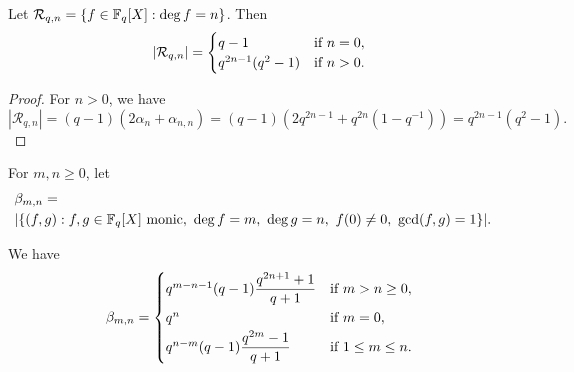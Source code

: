 \documentclass{amsart}
\numberwithin{equation}{section}
\theoremstyle{definition}
\newcommand{\f}{\Bbb F}
\begin{document}
\begin{Alem}\label{LA2}
Let $\mathcal R_{q,n}=\{f\in\f_q[X]:\deg f=n\}$. Then
\[
|\mathcal R_{q,n}|=\begin{cases}
q-1&\text{if}\ n=0,\cr
q^{2n-1}(q^2-1)&\text{if}\ n>0.
\end{cases}
\]
\end{Alem}

\begin{proof}
For $n>0$, we have
\[
|\mathcal R_{q,n}|=(q-1)(2\alpha_n+\alpha_{n,n})=(q-1)(2q^{2n-1}+q^{2n}(1-q^{-1}))=q^{2n-1}(q^2-1).
\]
\end{proof}

For $m,n\ge 0$, let
\begin{align*}
&\beta_{m,n}=\cr
&|\{(f,g):f,g\in\f_q[X]\ \text{monic},\ \deg f=m,\ \deg g=n,\ f(0)\ne0,\ \text{gcd}(f,g)=1\}|.
\end{align*}

\begin{Alem}\label{LA3}
We have
\[
\beta_{m,n}=\begin{cases}
q^{m-n-1}(q-1)\displaystyle\frac{q^{2n+1}+1}{q+1}&\text{if}\ m>n\ge 0,\vspace{0.2em}\cr
q^n&\text{if}\ m=0,\vspace{0.2em}\cr
q^{n-m}(q-1)\displaystyle\frac{q^{2m}-1}{q+1}&\text{if}\ 1\le m\le n.
\end{cases}
\]
\end{Alem}
\end{document}
